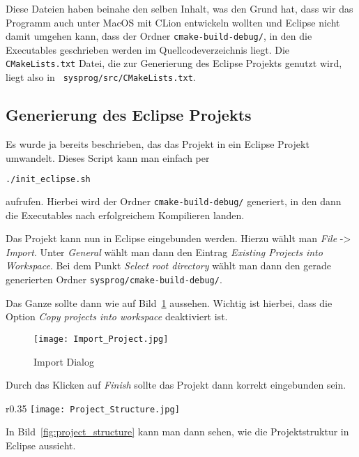 Diese Dateien haben beinahe den selben Inhalt, was den Grund hat, dass wir das Programm auch unter MacOS mit CLion entwickeln wollten und Eclipse nicht damit umgehen kann, dass der Ordner \texttt{cmake-build-debug/}, in den die Executables geschrieben werden im Quellcodeverzeichnis liegt. Die \texttt{CMakeLists.txt} Datei, die zur Generierung des Eclipse Projekts genutzt wird, liegt also in \texttt{
sysprog/src/CMakeLists.txt}.

\subsection{Generierung des Eclipse Projekts}
Es wurde ja bereits beschrieben, das das Projekt in ein Eclipse Projekt umwandelt. Dieses Script kann man einfach per

\begin{lstlisting}[language=bash,numbers=none]
./init_eclipse.sh
\end{lstlisting}

aufrufen. Hierbei wird der Ordner \texttt{cmake-build-debug/} generiert, in den dann die Executables nach erfolgreichem Kompilieren landen.

Das Projekt kann nun in Eclipse eingebunden werden. Hierzu wählt man \textit{File} -> \textit{Import}. Unter \textit{General} wählt man dann den Eintrag \textit{Existing Projects into Workspace}.
Bei dem Punkt \textit{Select root directory} wählt man dann den gerade generierten Ordner \texttt{sysprog/cmake-build-debug/}.

Das Ganze sollte dann wie auf Bild~\ref{fig:import_project} aussehen. Wichtig ist hierbei, dass die Option \textit{Copy projects into workspace} deaktiviert ist.

\begin{figure}[!htb]
    \centering
      \texttt{[image: Import\_Project.jpg]}
    \caption{Import Dialog}\label{fig:import_project}
\end{figure}

Durch das Klicken auf \textit{Finish} sollte das Projekt dann korrekt eingebunden sein.
\clearpage

\setlength{\intextsep}{-20pt}%
\begin{wrapfigure}{r}{0.35\textwidth}
  \centering
    \texttt{[image: Project\_Structure.jpg]}
    \caption{Die Projekt\-struktur in Eclipse}\label{fig:project_structure}
\end{wrapfigure}

In Bild~\ref{fig:project_structure} kann man dann sehen, wie die Projektstruktur in Eclipse aussieht.

